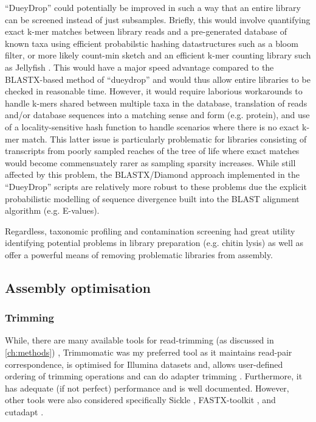 ``DueyDrop'' could potentially be improved in such a way that an entire library can be screened instead of just subsamples.
Briefly, this would involve quantifying exact k-mer matches between library reads and a pre-generated database of known taxa
using efficient probabilstic hashing datastructures such as a bloom filter, or more likely count-min sketch and an efficient
k-mer counting library such as Jellyfish \citep{Marcais2011}.  This would have a major speed advantage compared to the BLASTX-based method of ``dueydrop''
and would thus allow entire libraries to be checked in reasonable time.  However, it would require laborious workarounds to handle
k-mers shared between multiple taxa in the database, translation of reads and/or database sequences into a matching sense and form (e.g. protein),
and use of a locality-sensitive hash function to handle scenarios where there is no exact k-mer match. This latter issue is particularly
problematic for libraries consisting of transcripts from poorly sampled reaches of the tree of life where exact matches would become
commensuately rarer as sampling sparsity increases.  
While still affected by this problem, the BLASTX/Diamond approach implemented in the ``DueyDrop'' scripts are relatively more robust to these
problems due the explicit probabilistic modelling of sequence divergence built into the BLAST alignment algorithm (e.g. E-values).

Regardless, taxonomic profiling and contamination screening had great utility identifying potential problems in library preparation (e.g. chitin lysis) 
as well as offer a powerful means of removing problematic libraries from assembly.

\subsection{Assembly optimisation}

\subsubsection{Trimming}
While, there are many available tools for read-trimming (as discussed in \ref{ch:methods}) , 
Trimmomatic was my preferred tool as it maintains read-pair correspondence, is optimised for Illumina datasets and, allows user-defined ordering of trimming operations and can do adapter trimming \citep{Bolger2014a}.  
Furthermore, it has adequate (if not perfect) performance and is well documented.
However, other tools were also considered specifically Sickle \citep{JoshiGitHub}, FASTX-toolkit \citep{gordon2010fastx}, 
and cutadapt \citep{martin2011cutadapt}.

